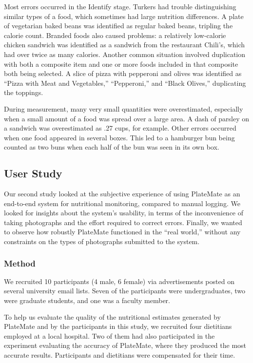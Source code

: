 Most errors occurred in the Identify stage.  Turkers had trouble distinguishing similar types of a food, which sometimes had large nutrition differences.  A plate of vegetarian baked beans was identified as regular baked beans, tripling the calorie count.  Branded foods also caused problems: a relatively low-calorie chicken sandwich was identified as a sandwich from the restaurant Chili's, which had over twice as many calories.  Another common situation involved duplication with both a composite item and one or more foods included in that composite both being selected.  A slice of pizza with pepperoni and olives was identified as ``Pizza with Meat and Vegetables,'' ``Pepperoni,'' and ``Black Olives,'' duplicating the toppings.

During measurement, many very small quantities were overestimated, especially when a small amount of a food was spread over a large area.  A dash of parsley on a sandwich was overestimated as .27 cups, for example.  Other errors occurred when one food appeared in several boxes. This led to a hamburger bun being counted as two buns when each half of the bun was seen in its own box.

\subsection{User Study}
Our second study looked at the subjective experience of using PlateMate as an end-to-end system for nutritional monitoring, compared to manual logging.  We looked for insights about the system's usability, in terms of the inconvenience of taking photographs and the effort required to correct errors.  Finally, we wanted to observe how robustly PlateMate functioned in the ``real world,'' without any constraints on the types of photographs submitted to the system.

\subsubsection{Method}
We recruited 10 participants (4 male, 6 female) via advertisements posted on several university email lists.  Seven of the participants were undergraduates, two were graduate students, and one was a faculty member.

To help us evaluate the quality of the nutritional estimates generated by PlateMate and by the participants in this study, we recruited four dietitians employed at a local hospital.  Two of them had also participated in the experiment evaluating the accuracy of PlateMate, where they produced the most accurate results. Participants and dietitians were compensated for their time.

